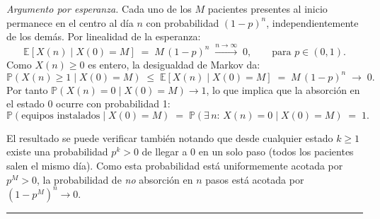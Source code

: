 \documentclass[10pt,a4paper]{article}
\newcommand{\Prob}[1]{\mathbb{P}\!\left(#1\right)}
\newcommand{\E}[1]{\mathbb{E}\!\left[#1\right]}
\newenvironment{nota}{\begin{tcolorbox}[notebox]}{\end{tcolorbox}}
\begin{document}
\medskip
\textit{Argumento por esperanza.}\quad
Cada uno de los $M$ pacientes presentes al inicio permanece en el centro al d\'ia
$n$ con probabilidad $(1-p)^n$, independientemente de los dem\'as. Por linealidad
de la esperanza:
\[
  \E{X(n)\mid X(0)=M} \;=\; M\,(1-p)^n \;\xrightarrow{n\to\infty}\; 0,
  \qquad \text{para } p\in(0,1).
\]
Como $X(n)\ge 0$ es entero, la desigualdad de Markov da:
\[
  \Prob{X(n)\ge 1 \mid X(0)=M}
  \;\le\; \E{X(n)\mid X(0)=M}
  \;=\; M\,(1-p)^n \;\to\; 0.
\]
Por tanto $\Prob{X(n)=0\mid X(0)=M}\to 1$, lo que implica que la absorci\'on en
el estado 0 ocurre con probabilidad 1:
\[
  \boxed{\Prob{\text{equipos instalados}\mid X(0)=M}
    \;=\; \Prob{\exists\,n:\,X(n)=0 \mid X(0)=M} \;=\; 1.}
\]

\begin{nota}
  El resultado se puede verificar tambi\'en notando que desde cualquier estado
  $k\ge 1$ existe una probabilidad $p^k>0$ de llegar a 0 en un solo paso
  (todos los pacientes salen el mismo d\'ia). Como esta probabilidad est\'a
  uniformemente acotada por $p^M>0$, la probabilidad de \emph{no} absorci\'on
  en $n$ pasos est\'a acotada por $(1-p^M)^n\to 0$.
\end{nota}

\vspace{10pt}
{\color{subsecbg!60}\hrule}
\vspace{6pt}
\end{document}
